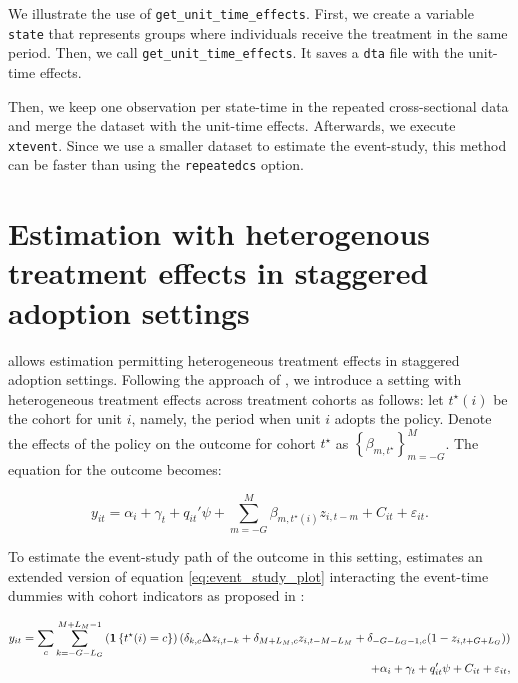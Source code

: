 \documentclass[12pt]{article}
\begin{document}
We illustrate the use of \texttt{get\_unit\_time\_effects}.
First, we create a variable \texttt{state} that represents groups where individuals receive the treatment in the same period.
Then, we call \texttt{get\_unit\_time\_effects}.
It saves a \texttt{dta} file with the unit-time effects.

\begin{stlog}
	\nullskip
\end{stlog}

Then, we keep one observation per state-time in the repeated cross-sectional data and merge the dataset with the unit-time effects.
Afterwards, we execute \texttt{xtevent}.
Since we use a smaller dataset to estimate the event-study, this method can be faster than using the \texttt{repeatedcs} option.

\begin{stlog}
	\nullskip
\end{stlog}

\section{Estimation with heterogenous treatment effects in staggered adoption settings}
\label{sec:sunabraham}

\xtevent allows estimation permitting heterogeneous treatment effects in staggered adoption settings.
Following the approach of \cite{sun2021estimating}, we introduce a setting with heterogeneous treatment effects across treatment cohorts as follows:
let $t^{\star} (i)$ be the cohort for unit $i$, namely, the period when unit $i$ adopts the policy.
Denote the effects of the policy on the outcome for cohort $t^{\star}$ as $\left\{ \beta_{m,t^{\star}} \right\}_{m=-G}^M$.
The equation for the outcome becomes:

\begin{equation*}
y_{it} =  \alpha_{i} + \gamma_{t} + q_{it}'\psi  + \sum_{m=-G}^{M}\beta_{m,t^{\star}(i)} z_{i,t-m} + C_{it} + \varepsilon_{it}.
\end{equation*}

To estimate the event-study path of the outcome in this setting, \xtevent estimates an extended version of equation \eqref{eq:event_study_plot} interacting the event-time dummies with cohort indicators as proposed in \cite{freyaldenhoven2021visualization}:

\begin{equation}
\begin{split}
y_{it} = \sum_{c} \sum_{k=-G-L_G}^{M+L_M -1} \left(  \mathbf{1}\left\{ t^{\star} (i) = c \right\} \right) \left( \delta_{k,c} \Delta  z_{i,t-k} + \delta_{M+L_M,c} z_{i,t-M-L_M} + \delta_{-G-L_G-1,c}(1-z_{i,t+G+L_G}) \right)
\\ \centering
+ \alpha_{i} + \gamma_{t} + q'_{it}\psi + C_{it} + \varepsilon_{it},
\end{split}
\label{eq:sunabraham}
\end{equation}
\end{document}

